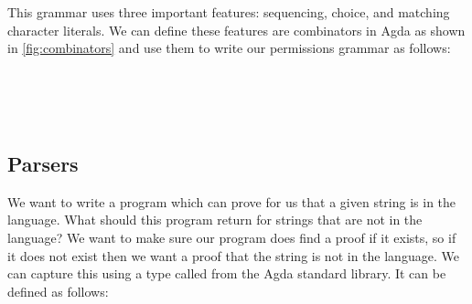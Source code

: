 This grammar uses three important features: sequencing, choice, and matching character literals. We can define these features are combinators in Agda as shown in \cref{fig:combinators} and use them to write our permissions grammar as follows:

\begin{code}[hide]%
%
\>[4]\AgdaSpace{}%
\AgdaSpace{}%
\AgdaSpace{}%
\AgdaSpace{}%
\AgdaSymbol{:}\AgdaSpace{}%
\<%
\end{code}
\begin{code}%
%
\>[4]%
\>[17]\AgdaSymbol{=}\AgdaSpace{}%
\AgdaSpace{}%
\AgdaSpace{}%
\AgdaSpace{}%
\AgdaSpace{}%
\<%
\\
%
\>[4]%
\>[17]\AgdaSymbol{=}\AgdaSpace{}%
\AgdaSpace{}%
\AgdaSpace{}%
\AgdaSpace{}%
\AgdaSpace{}%
\<%
\\
%
\>[4]%
\>[17]\AgdaSymbol{=}\AgdaSpace{}%
\AgdaSpace{}%
\AgdaSpace{}%
\AgdaSpace{}%
\AgdaSpace{}%
\<%
\\
%
\>[4]%
\>[17]\AgdaSymbol{=}\AgdaSpace{}%
\AgdaSpace{}%
\AgdaSpace{}%
\AgdaSpace{}%
\AgdaSpace{}%
\<%
\end{code}

\subsection{Parsers}

We want to write a program which can prove for us that a given string is in the language. What should this program return for strings that are not in the language? We want to make sure our program does find a proof if it exists, so if it does not exist then we want a proof that the string is not in the language. We can capture this using a type called  from the Agda standard library. It can be defined as follows:


